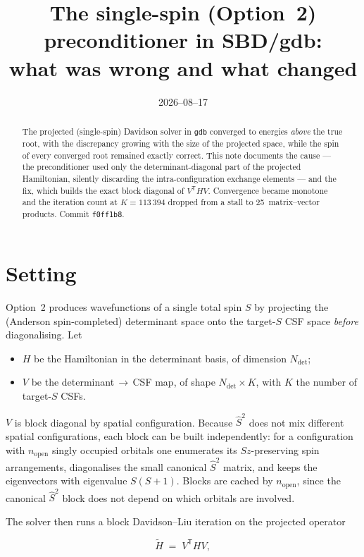 \documentclass[11pt,a4paper]{article}
\title{The single-spin (Option~2) preconditioner in SBD/gdb:\\
what was wrong and what changed}
\author{}
\date{2026--08--17}
\newcommand{\Sop}{\hat{S}}
\newcommand{\code}[1]{\texttt{\small #1}}
\begin{document}
\maketitle

\begin{abstract}
\noindent
The projected (single-spin) Davidson solver in \code{gdb} converged to
energies \emph{above} the true root, with the discrepancy growing with the
size of the projected space, while the spin of every converged root remained
exactly correct. This note documents the cause --- the preconditioner used
only the determinant-diagonal part of the projected Hamiltonian, silently
discarding the intra-configuration exchange elements --- and the fix, which
builds the exact block diagonal of $V^{\mathsf T} H V$. Convergence became
monotone and the iteration count at $K=113\,394$ dropped from a stall to
25~matrix--vector products. Commit \code{f0ff1b8}.
\end{abstract}

\section{Setting}

Option~2 produces wavefunctions of a single total spin $S$ by projecting the
(Anderson spin-completed) determinant space onto the target-$S$ CSF space
\emph{before} diagonalising. Let

\begin{itemize}\itemsep2pt
  \item $H$ be the Hamiltonian in the determinant basis, of dimension
        $N_{\text{det}}$;
  \item $V$ be the determinant$\,\to\,$CSF map, of shape
        $N_{\text{det}}\times K$, with $K$ the number of target-$S$ CSFs.
\end{itemize}

$V$ is block diagonal by spatial configuration. Because $\Sop^2$ does not mix
different spatial configurations, each block can be built independently: for a
configuration with $n_{\text{open}}$ singly occupied orbitals one enumerates
its $Sz$-preserving spin arrangements, diagonalises the small canonical
$\Sop^2$ matrix, and keeps the eigenvectors with eigenvalue
$S(S+1)$. Blocks are cached by $n_{\text{open}}$, since the canonical
$\Sop^2$ block does not depend on which orbitals are involved.

The solver then runs a block Davidson--Liu iteration on the projected operator

\begin{equation}
  \tilde H \;=\; V^{\mathsf T} H V ,
  \label{eq:proj}
\end{equation}
\end{document}

